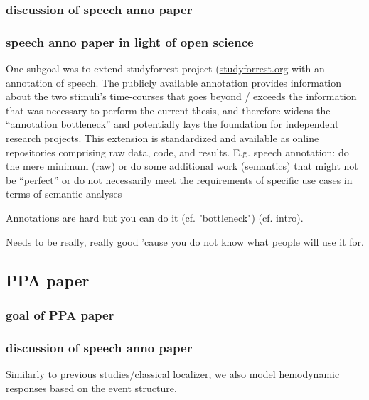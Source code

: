 \subsubsection{discussion of speech anno paper}

\subsubsection{speech anno paper in light of open science}

One subgoal was to extend studyforrest project
(\href{www.studyforrest.org}{\url{studyforrest.org}} with an annotation of
speech.
The publicly available annotation \citep{haeusler2021speechanno} provides
information about the two stimuli's time-courses that goes beyond / exceeds the
information that was necessary to perform the current thesis, and therefore
widens the ``annotation bottleneck'' and potentially lays the foundation for
independent research projects.
%
This extension is standardized and available as online repositories comprising
raw data, code, and results.
%
E.g. speech annotation: do the mere minimum (raw) or do some additional work
(semantics) that might not be ``perfect'' or do not necessarily meet the
requirements of specific use cases in terms of semantic analyses
%

%
Annotations are hard but you can do it (cf. "bottleneck") (cf. intro).

%
Needs to be really, really good 'cause you do not know what people will use it
for.



\subsection{PPA paper}

\subsubsection{goal of PPA paper}

\subsubsection{discussion of speech anno paper}

%
Similarly to previous studies/classical localizer, we also model hemodynamic
responses based on the event structure.

